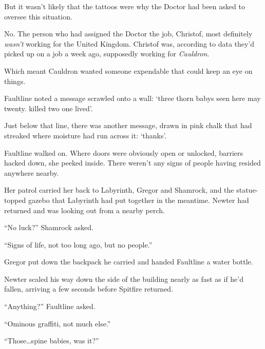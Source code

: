 But it wasn't likely that the tattoos were why the Doctor had been asked to oversee this situation.



No.  The person who had assigned the Doctor the job, Christof, most definitely \emph{wasn't} working for the United Kingdom.  Christof was, according to data they'd picked up on a job a week ago, supposedly working for \emph{Cauldron}.



Which meant Cauldron wanted someone expendable that could keep an eye on things.



Faultline noted a message scrawled onto a wall: `three thorn babys seen here may twenty. killed two one lived'.



Just below that line, there was another message, drawn in pink chalk that had streaked where moisture had run across it: `thanks'.



Faultline walked on.  Where doors were obviously open or unlocked, barriers hacked down, she peeked inside.  There weren't any signs of people having resided anywhere nearby.



Her patrol carried her back to Labyrinth, Gregor and Shamrock, and the statue-topped gazebo that Labyrinth had put together in the meantime.  Newter had returned and was looking out from a nearby perch.



``No luck?'' Shamrock asked.



``Signs of life, not too long ago, but no people.''



Gregor put down the backpack he carried and handed Faultline a water bottle.



Newter scaled his way down the side of the building nearly as fast as if he'd fallen, arriving a few seconds before Spitfire returned.



``Anything?''  Faultline asked.



``Ominous graffiti, not much else.''



``Those\ldots spine babies, was it?''



